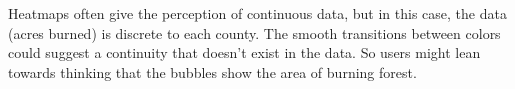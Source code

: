\begin{multicols}{2}
Heatmaps often give the perception of continuous data, but in this case, the data (acres burned) is discrete to each county. The smooth transitions between colors could suggest a continuity that doesn't exist in the data. So users might lean towards thinking that the bubbles show the area of burning forest.
\end{multicols}